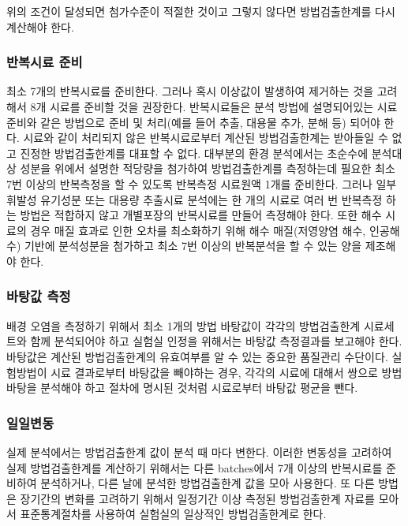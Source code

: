 \documentclass[
]{book}
\begin{document}
위의 조건이 달성되면 첨가수준이 적절한 것이고 그렇지 않다면 방법검출한계를 다시 계산해야 한다.

\hypertarget{uxbc18uxbcf5uxc2dcuxb8cc-uxc900uxbe44}{%
\subsubsection{반복시료 준비}\label{uxbc18uxbcf5uxc2dcuxb8cc-uxc900uxbe44}}

최소 7개의 반복시료를 준비한다. 그러나 혹시 이상값이 발생하여 제거하는 것을 고려해서 8개 시료를 준비할 것을 권장한다. 반복시료들은 분석 방법에 설명되어있는 시료 준비와 같은 방법으로 준비 및 처리(예를 들어 추출, 대용물 추가, 분해 등) 되어야 한다. 시료와 같이 처리되지 않은 반복시료로부터 계산된 방법검출한계는 받아들일 수 없고 진정한 방법검출한계를 대표할 수 없다. 대부분의 환경 분석에서는 초순수에 분석대상 성분을 위에서 설명한 적당량을 첨가하여 방법검출한계를 측정하는데 필요한 최소 7번 이상의 반복측정을 할 수 있도록 반복측정 시료원액 1개를 준비한다. 그러나 일부 휘발성 유기성분 또는 대용량 추출시료 분석에는 한 개의 시료로 여러 번 반복측정 하는 방법은 적합하지 않고 개별포장의 반복시료를 만들어 측정해야 한다. 또한 해수 시료의 경우 매질 효과로 인한 오차를 최소화하기 위해 해수 매질(저영양염 해수, 인공해수) 기반에 분석성분을 첨가하고 최소 7번 이상의 반복분석을 할 수 있는 양을 제조해야 한다.

\hypertarget{uxbc14uxd0d5uxac12-uxce21uxc815}{%
\subsubsection{바탕값 측정}\label{uxbc14uxd0d5uxac12-uxce21uxc815}}

배경 오염을 측정하기 위해서 최소 1개의 방법 바탕값이 각각의 방법검출한계 시료세트와 함께 분석되어야 하고 실험실 인정을 위해서는 바탕값 측정결과를 보고해야 한다. 바탕값은 계산된 방법검출한계의 유효여부를 알 수 있는 중요한 품질관리 수단이다. 실험방법이 시료 결과로부터 바탕값을 빼야하는 경우, 각각의 시료에 대해서 쌍으로 방법 바탕을 분석해야 하고 절차에 명시된 것처럼 시료로부터 바탕값 평균을 뺀다.

\hypertarget{uxc77cuxc77cuxbcc0uxb3d9}{%
\subsubsection{일일변동}\label{uxc77cuxc77cuxbcc0uxb3d9}}

실제 분석에서는 방법검출한계 값이 분석 때 마다 변한다. 이러한 변동성을 고려하여 실제 방법검출한계를 계산하기 위해서는 다른 batches에서 7개 이상의 반복시료를 준비하여 분석하거나, 다른 날에 분석한 방법검출한계 값을 모아 사용한다. 또 다른 방법은 장기간의 변화를 고려하기 위해서 일정기간 이상 측정된 방법검출한계 자료를 모아서 표준통계절차를 사용하여 실험실의 일상적인 방법검출한계로 한다.
\end{document}
